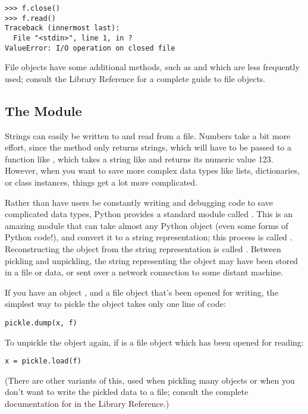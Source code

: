 \documentclass{manual}
\begin{document}
\begin{verbatim}
>>> f.close()
>>> f.read()
Traceback (innermost last):
  File "<stdin>", line 1, in ?
ValueError: I/O operation on closed file
\end{verbatim}

File objects have some additional methods, such as 
and  which are less frequently used; consult the
Library Reference for a complete guide to file objects.

\subsection{The  Module \label{pickle}}

Strings can easily be written to and read from a file. Numbers take a
bit more effort, since the  method only returns
strings, which will have to be passed to a function like
, which takes a string like  and
returns its numeric value 123.  However, when you want to save more
complex data types like lists, dictionaries, or class instances,
things get a lot more complicated.

Rather than have users be constantly writing and debugging code to
save complicated data types, Python provides a standard module called
.  This is an amazing module that can take almost
any Python object (even some forms of Python code!), and convert it to
a string representation; this process is called .  
Reconstructing the object from the string representation is called
.  Between pickling and unpickling, the string
representing the object may have been stored in a file or data, or
sent over a network connection to some distant machine.

If you have an object , and a file object  that's been
opened for writing, the simplest way to pickle the object takes only
one line of code:

\begin{verbatim}
pickle.dump(x, f)
\end{verbatim}

To unpickle the object again, if  is a file object which has
been opened for reading:

\begin{verbatim}
x = pickle.load(f)
\end{verbatim}

(There are other variants of this, used when pickling many objects or
when you don't want to write the pickled data to a file; consult the
complete documentation for  in the Library Reference.)
\end{document}
